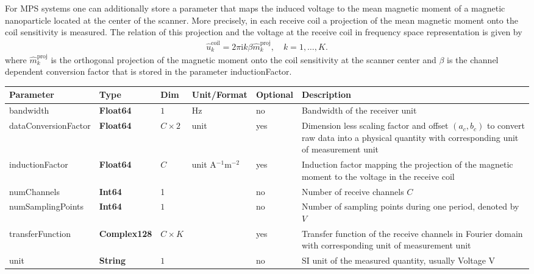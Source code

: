 \documentclass[landscape,a4paper]{article} %
\newcommand{\inltab}[1]{{\ttfamily\bfseries\color{blue}#1}}
\newcommand{\inlvar}[1]{{\ttfamily#1}}
\begin{document}
\begin{multicols}{2}
For MPS systems one can additionally store a parameter that maps the induced voltage to the mean magnetic moment of a magnetic nanoparticle located at the center of the scanner. More precisely, in each receive coil a projection of the mean magnetic moment onto the coil sensitivity is measured. The relation of this projection and the voltage at the receive coil in frequency space representation is given by
\begin{align*}
\hat{u}_k^\text{coil} = 2\pi \textrm{i} k \beta \hat{m}_k^\text{proj} , \quad k=1,\dots,K.
\end{align*}
where  
$\hat m_k^\text{proj}$ is the orthogonal projection of the magnetic moment onto the coil sensitivity at the scanner center
and $\beta$ is the channel dependent conversion factor that is stored in the parameter  \inlvar{inductionFactor}.
\end{multicols}

\setlength\extrarowheight{5pt}
\noindent \begin{tabularx}{\columnwidth}{lllllX} 
\textbf{Parameter} & \textbf{Type} & \textbf{Dim} & \textbf{Unit/Format} & \textbf{Optional} & \textbf{Description} \\ \hline 
\inlvar{bandwidth} & \inltab{Float64} & $1$ & Hz & no & Bandwidth of the receiver unit \\ \hline
\inlvar{dataConversionFactor} & \inltab{Float64} & $C \times 2$ & \inlvar{unit} & yes & Dimension less scaling factor and offset $(a_c, b_c)$ to convert raw data into a physical quantity with corresponding unit of measurement \inlvar{unit} \\ \hline 
\inlvar{inductionFactor} & \inltab{Float64} & $C$ & \inlvar{unit} A$^{-1}$m$^{-2}$ & yes & Induction factor mapping the projection of the magnetic moment to the voltage in the receive coil  \\ \hline
\inlvar{numChannels} & \inltab{Int64} & 1 & & no & Number of receive channels $C$ \\ \hline 
\inlvar{numSamplingPoints} & \inltab{Int64} & $1$ &  & no & Number of sampling points during one period, denoted by $V$ \\ \hline
\inlvar{transferFunction} & \inltab{Complex128} & $C \times K$ & & yes & Transfer function of the receive channels in Fourier domain with corresponding unit of measurement \inlvar{unit} \\ \hline
\inlvar{unit} & \inltab{String} & $1$ & & no & SI unit of the measured quantity, usually Voltage V \\ \hline 
\end{tabularx}
\setlength\extrarowheight{0pt}
\end{document}
